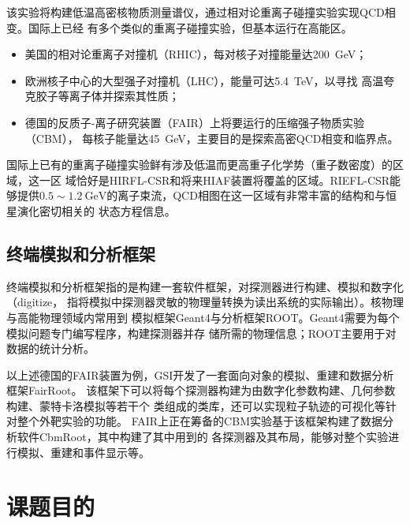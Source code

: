\documentclass[bachelor,openany,oneside,color]{buaathesis}
\begin{document}
该实验将构建低温高密核物质测量谱仪，通过相对论重离子碰撞实验实现QCD相变。国际上已经
有多个类似的重离子碰撞实验，但基本运行在高能区。
\begin{itemize}
	\item 美国的相对论重离子对撞机（RHIC），每对核子对撞能量达\SI{200}{\giga\eV}；
	\item 欧洲核子中心的大型强子对撞机（LHC），能量可达\SI{5.4}{\tera\eV}，以寻找
		高温夸克胶子等离子体并探索其性质；
	\item 德国的反质子-离子研究装置（FAIR）上将要运行的压缩强子物质实验（CBM），
		每核子能量达\SI{45}{\giga\eV}，主要目的是探索高密QCD相变和临界点。
\end{itemize}
国际上已有的重离子碰撞实验鲜有涉及低温而更高重子化学势（重子数密度）的区域，这一区
域恰好是HIRFL-CSR和将来HIAF装置将覆盖的区域。RIEFL-CSR能够提供$0.5\sim\SI{1.2}
	{\giga\eV}$的离子束流，QCD相图在这一区域有非常丰富的结构和与恒星演化密切相关的
状态方程信息。

\subsection{终端模拟和分析框架}

终端模拟和分析框架指的是构建一套软件框架，对探测器进行构建、模拟和数字化（digitize，
指将模拟中探测器灵敏的物理量转换为读出系统的实际输出）。核物理与高能物理领域内常用到
模拟框架Geant4与分析框架ROOT。Geant4需要为每个模拟问题专门编写程序，构建探测器并存
储所需的物理信息；ROOT主要用于对数据的统计分析。

以上述德国的FAIR装置为例，GSI开发了一套面向对象的模拟、重建和数据分析框架FairRoot。
该框架下可以将每个探测器构建为由数字化参数构建、几何参数构建、蒙特卡洛模拟等若干个
类组成的类库，还可以实现粒子轨迹的可视化等针对整个外靶实验的功能。\cite{FairRoot}
FAIR上正在筹备的CBM实验基于该框架构建了数据分析软件CbmRoot，其中构建了其中用到的
各探测器及其布局，能够对整个实验进行模拟、重建和事件显示等。

\section{课题目的}
\end{document}
